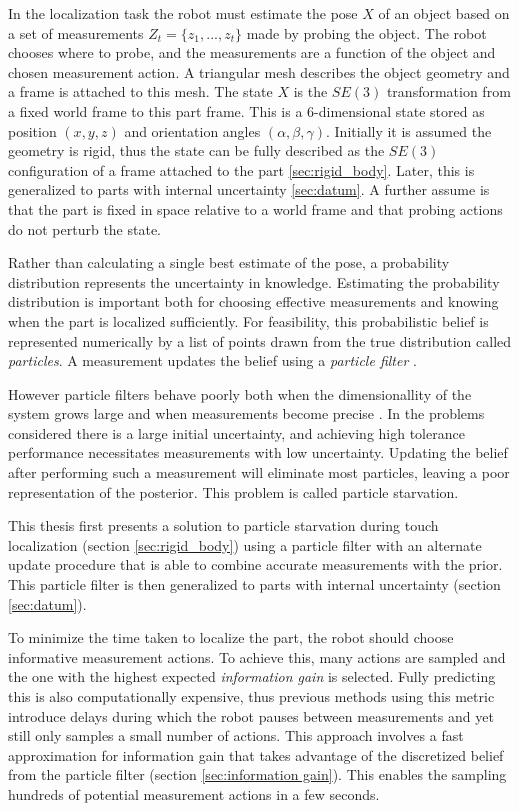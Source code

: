 \documentclass[../thesis.tex]{subfiles}
\begin{document}
In the localization task the robot must estimate the pose $X$ of an object based on a set of measurements $Z_t = \{z_1, ..., z_t\}$ made by probing the object.
The robot chooses where to probe, and the measurements are a function of the object and chosen measurement action.
A triangular mesh describes the object geometry and a frame is attached to this mesh. 
The state $X$ is the $SE(3)$ transformation from a fixed world frame to this part frame. 
This is a 6-dimensional state stored as position $(x,y,z)$ and orientation angles $(\alpha, \beta, \gamma)$. 
Initially it is assumed the geometry is rigid, thus the state can be fully described as the $SE(3)$ configuration of a frame attached to the part \ref{sec:rigid_body}.
Later, this is generalized to parts with internal uncertainty \ref{sec:datum}.
A further assume is that the part is fixed in space relative to a world frame and that probing actions do not perturb the state. 

Rather than calculating a single best estimate of the pose, a probability distribution represents the uncertainty in knowledge.
Estimating the probability distribution is important both for choosing effective measurements and knowing when the part is localized sufficiently. 
For feasibility, this probabilistic belief is represented numerically by a list of points drawn from the true distribution called \textit{particles}. 
A measurement updates the belief using a \textit{particle filter} \cite{Thrun2000a}.

However particle filters behave poorly both when the dimensionallity of the system grows large and when measurements become precise \cite{Koval2013}. 
In the problems considered there is a large initial uncertainty, and achieving high tolerance performance necessitates measurements with low uncertainty.
Updating the belief after performing such a measurement will eliminate most particles, leaving a poor representation of the posterior. This problem is called particle starvation.

This thesis first presents a solution to particle starvation during touch localization (section \ref{sec:rigid_body}) using a particle filter with an alternate update procedure that is able to combine accurate measurements with the prior. 
This particle filter is then generalized to parts with internal uncertainty (section \ref{sec:datum}).

To minimize the time taken to localize the part, the robot should choose informative measurement actions.
To achieve this, many actions are sampled and the one with the highest expected \textit{information gain} is selected. 
Fully predicting this is also computationally expensive, thus previous methods using this metric introduce delays during which the robot pauses between measurements and yet still only samples a small number of actions.
This approach involves a fast approximation for information gain that takes advantage of the discretized belief from the particle filter (section \ref{sec:information gain}). 
This enables the sampling hundreds of potential measurement actions in a few seconds. 
\end{document}
